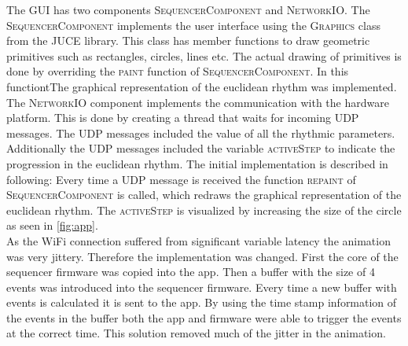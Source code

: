 The GUI has two components \textsc{SequencerComponent} and \textsc{NetworkIO}. The \textsc{SequencerComponent} implements the user interface using the \textsc{Graphics} class from the JUCE library. This class has member functions to draw geometric primitives such as rectangles, circles, lines etc. The actual drawing of primitives is done by overriding the \textsc{paint} function of \textsc{SequencerComponent}. In this functiontThe graphical representation of the euclidean rhythm was implemented.\\
The \textsc{NetworkIO} component implements the communication with the hardware platform. This is done by creating a thread that waits for incoming UDP messages. The UDP messages included the value of all the rhythmic parameters. Additionally the UDP messages included the variable \textsc{activeStep} to indicate the progression in the euclidean rhythm. The initial implementation 
is described in following:
Every time a UDP message is received the function \textsc{repaint} of \textsc{SequencerComponent} is called, which redraws the graphical representation of the euclidean rhythm. The \textsc{activeStep} is visualized by increasing the size of the circle as seen in \cref{fig:app}.\\
As the WiFi connection suffered from significant variable latency the animation was very jittery. Therefore the implementation was changed. First the core of the sequencer firmware was copied into the app. Then a buffer with the size of 4 events was introduced into the sequencer firmware. Every time a new buffer with events is calculated it is sent to the app. By using the time stamp information of the events in the buffer both the app and firmware were able to trigger the events at the correct time. This solution removed much of the jitter in the animation.



    
            
    
                
        